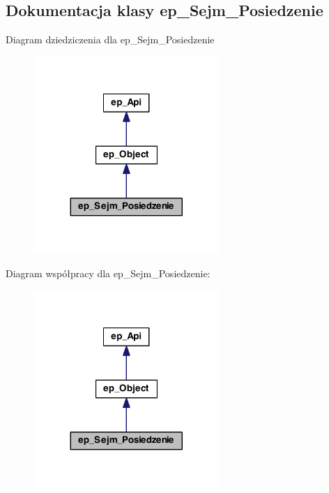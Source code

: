 \hypertarget{classep___sejm___posiedzenie}{\subsection{Dokumentacja klasy ep\-\_\-\-Sejm\-\_\-\-Posiedzenie}
\label{classep___sejm___posiedzenie}
}


Diagram dziedziczenia dla ep\-\_\-\-Sejm\-\_\-\-Posiedzenie\nopagebreak
\begin{figure}[H]
\begin{center}
\leavevmode
\includegraphics[width=200pt]{classep___sejm___posiedzenie__inherit__graph}
\end{center}
\end{figure}


Diagram współpracy dla ep\-\_\-\-Sejm\-\_\-\-Posiedzenie\-:\nopagebreak
\begin{figure}[H]
\begin{center}
\leavevmode
\includegraphics[width=200pt]{classep___sejm___posiedzenie__coll__graph}
\end{center}
\end{figure}
